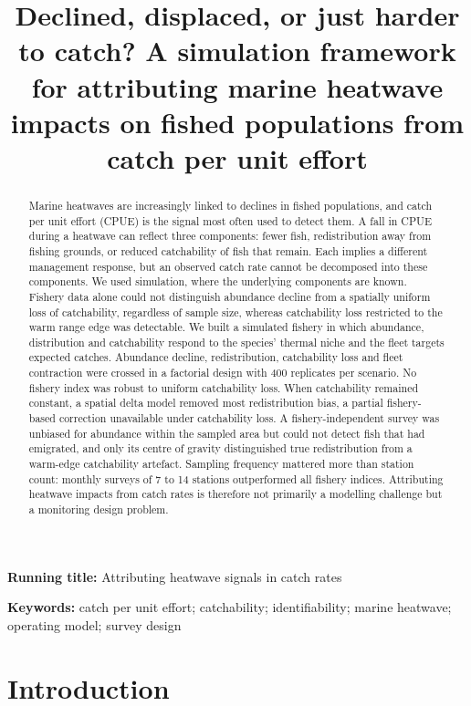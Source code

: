 \documentclass[11pt,a4paper]{article}
\title{Declined, displaced, or just harder to catch? A simulation framework for attributing marine heatwave impacts on fished populations from catch per unit effort}
\author{}
\date{}
\begin{document}
\maketitle
\linenumbers

\noindent\textbf{Running title:} Attributing heatwave signals in catch rates

\begin{abstract}
\noindent Marine heatwaves are increasingly linked to declines in fished populations, and catch per unit effort (CPUE) is the signal most often used to detect them. A fall in CPUE during a heatwave can reflect three components: fewer fish, redistribution away from fishing grounds, or reduced catchability of fish that remain. Each implies a different management response, but an observed catch rate cannot be decomposed into these components. We used simulation, where the underlying components are known. Fishery data alone could not distinguish abundance decline from a spatially uniform loss of catchability, regardless of sample size, whereas catchability loss restricted to the warm range edge was detectable. We built a simulated fishery in which abundance, distribution and catchability respond to the species' thermal niche and the fleet targets expected catches. Abundance decline, redistribution, catchability loss and fleet contraction were crossed in a factorial design with 400 replicates per scenario. No fishery index was robust to uniform catchability loss. When catchability remained constant, a spatial delta model removed most redistribution bias, a partial fishery-based correction unavailable under catchability loss. A fishery-independent survey was unbiased for abundance within the sampled area but could not detect fish that had emigrated, and only its centre of gravity distinguished true redistribution from a warm-edge catchability artefact. Sampling frequency mattered more than station count: monthly surveys of 7 to 14 stations outperformed all fishery indices. Attributing heatwave impacts from catch rates is therefore not primarily a modelling challenge but a monitoring design problem.
\end{abstract}

\noindent\textbf{Keywords:} catch per unit effort; catchability; identifiability; marine heatwave; operating model; survey design

\section{Introduction}
\end{document}
